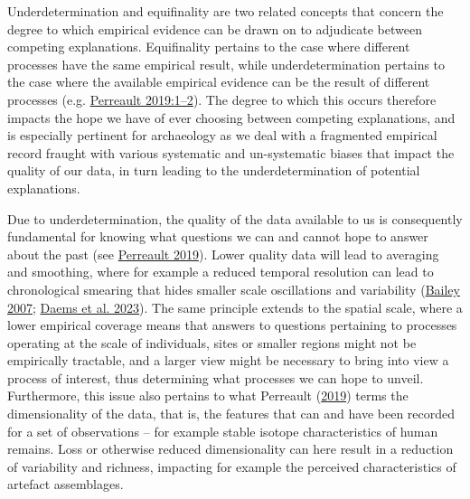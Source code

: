 \documentclass[
  12pt,
  a4paper,
  oneside]{book}
\begin{document}
Underdetermination and equifinality are two related concepts that concern the degree to which empirical evidence can be drawn on to adjudicate between competing explanations. Equifinality pertains to the case where different processes have the same empirical result, while underdetermination pertains to the case where the available empirical evidence can be the result of different processes (e.g. \protect\hyperlink{ref-perreault2019}{Perreault 2019:1--2}). The degree to which this occurs therefore impacts the hope we have of ever choosing between competing explanations, and is especially pertinent for archaeology as we deal with a fragmented empirical record fraught with various systematic and un-systematic biases that impact the quality of our data, in turn leading to the underdetermination of potential explanations.

Due to underdetermination, the quality of the data available to us is consequently fundamental for knowing what questions we can and cannot hope to answer about the past (see \protect\hyperlink{ref-perreault2019}{Perreault 2019}). Lower quality data will lead to averaging and smoothing, where for example a reduced temporal resolution can lead to chronological smearing that hides smaller scale oscillations and variability (\protect\hyperlink{ref-bailey2007}{Bailey 2007}; \protect\hyperlink{ref-daems2023}{Daems et al. 2023}). The same principle extends to the spatial scale, where a lower empirical coverage means that answers to questions pertaining to processes operating at the scale of individuals, sites or smaller regions might not be empirically tractable, and a larger view might be necessary to bring into view a process of interest, thus determining what processes we can hope to unveil. Furthermore, this issue also pertains to what Perreault (\protect\hyperlink{ref-perreault2019}{2019}) terms the dimensionality of the data, that is, the features that can and have been recorded for a set of observations -- for example stable isotope characteristics of human remains. Loss or otherwise reduced dimensionality can here result in a reduction of variability and richness, impacting for example the perceived characteristics of artefact assemblages.
\end{document}
